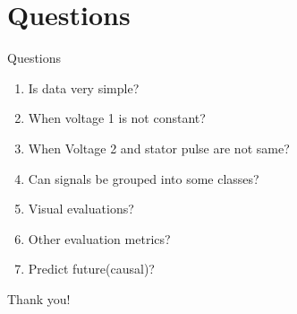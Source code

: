 \documentclass[handout]{beamer}
\begin{document}
\section{Questions}
\begin{frame}{Questions}
\begin{enumerate}
  \item Is data very simple?
  \item When voltage 1 is not constant?
  \item When Voltage 2 and stator pulse are not same?
  \item Can signals be grouped into some classes?
  \item Visual evaluations?
  \item Other evaluation metrics?
  \item Predict future(causal)?
\end{enumerate}
\end{frame}

\begin{frame}
\center
\color{blue}
\huge{Thank you!}\\
\end{frame}
\end{document}
